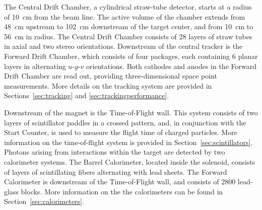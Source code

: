 


The Central Drift Chamber, a cylindrical straw-tube detector, starts at a radius of 10~cm from the beam line. The active volume of the chamber extends from 48~cm upstream to 102~cm downstream of the target center, and from 10~cm to 56~cm in radius. The Central Drift Chamber consists of 28 layers of straw tubes in axial and two stereo orientations. Downstream of the central tracker is the Forward Drift Chamber, which consists of four packages, each containing 6 planar layers in alternating $u$-$y$-$v$ orientations. Both cathodes and anodes in the Forward Drift Chamber are read out, providing three-dimensional space point measurements. More details on the tracking system are provided in Sections~\ref{sec:tracking} and \ref{sec:trackingperformance}. 

Downstream of the magnet is the Time-of-Flight wall. This system consists of two layers of scintillator paddles in a crossed pattern, and, in conjunction with the Start Counter, is used to measure the flight time of charged particles. More information on the time-of-flight system is provided in Section~\ref{sec:scintillators}. 
Photons arising from interactions within the \gx{} target are detected by two calorimeter systems. The Barrel Calorimeter, located inside the solenoid, consists of layers of scintillating fibers alternating with lead sheets. The Forward Calorimeter is downstream of the Time-of-Flight wall, and consists of $2800$ lead-glass blocks. More information on the the calorimeters can be found in Section~\ref{sec:calorimeters}.

